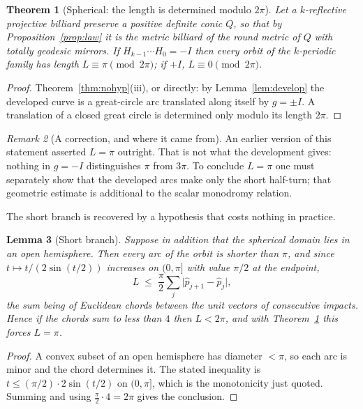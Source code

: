 \documentclass[11pt,a4paper]{article}
\theoremstyle{plain}
\newtheorem{theorem}{Theorem}[section]
\newtheorem{lemma}[theorem]{Lemma}
\theoremstyle{definition}
\theoremstyle{remark}
\newtheorem{remark}[theorem]{Remark}
\begin{document}
\begin{theorem}[Spherical: the length is determined modulo $2\pi$]\label{thm:halfcircle}
Let a $k$-reflective projective billiard preserve a positive definite conic $Q$, so
that by Proposition~\ref{prop:law} it is the metric billiard of the round metric of
$Q$ with totally geodesic mirrors. If $H_{k-1}\cdots H_0=-I$ then every orbit of the
$k$-periodic family has length $L\equiv\pi\pmod{2\pi}$; if $+I$, $L\equiv0\pmod{2\pi}$.
\end{theorem}

\begin{proof}
Theorem~\ref{thm:nohyp}(iii), or directly: by Lemma~\ref{lem:develop} the developed
curve is a great-circle arc translated along itself by $g=\pm I$. A translation of a
closed great circle is determined only modulo its length $2\pi$.
\end{proof}

\begin{remark}[A correction, and where it came from]
An earlier version of this statement asserted $L=\pi$ outright. That is not what the
development gives: nothing in $g=-I$ distinguishes $\pi$ from $3\pi$. To conclude
$L=\pi$ one must separately show that the developed arcs make only the short
half-turn; that geometric estimate is additional to the scalar monodromy relation.
\end{remark}

The short branch is recovered by a hypothesis that costs nothing in practice.

\begin{lemma}[Short branch]\label{lem:shortbranch}
Suppose in addition that the spherical domain lies in an open hemisphere. Then every
arc of the orbit is shorter than $\pi$, and since $t\mapsto t/(2\sin(t/2))$ increases
on $(0,\pi]$ with value $\pi/2$ at the endpoint,
\[
  L\;\le\;\frac\pi2\sum_{j}\bigl|\hat p_{j+1}-\hat p_j\bigr| ,
\]
the sum being of Euclidean chords between the unit vectors of consecutive impacts.
Hence if the chords sum to less than $4$ then $L<2\pi$, and with
Theorem~\ref{thm:halfcircle} this forces $L=\pi$.
\end{lemma}

\begin{proof}
A convex subset of an open hemisphere has diameter $<\pi$, so each arc is minor and
the chord determines it. The stated inequality is $t\le(\pi/2)\cdot2\sin(t/2)$ on
$(0,\pi]$, which is the monotonicity just quoted. Summing and using
$\tfrac\pi2\cdot4=2\pi$ gives the conclusion.
\end{proof}
\end{document}
